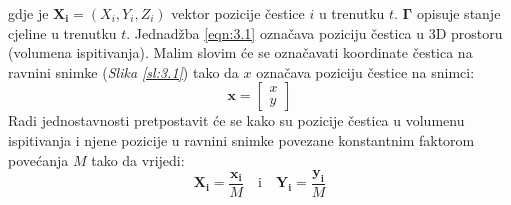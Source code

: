 gdje je $\boldsymbol{X_{i}}=\left(X_{i}, Y_{i}, Z_{i}\right)$ vektor pozicije čestice $i$ u trenutku $t$. $\boldsymbol{\Gamma}$ opisuje stanje cjeline u trenutku $t$. Jednadžba \ref{eqn:3.1} označava poziciju čestica u 3D prostoru (volumena ispitivanja). Malim slovim će se označavati koordinate čestica na ravnini snimke (\textit{Slika \ref{sl:3.1}}) tako da $x$ označava poziciju čestice na snimci:
\begin{equation}
	\boldsymbol{x} = \left[ \begin{array}{c}
		x\\
		y
	\end{array}\right]
\label{eqn:3.2}
\end{equation}
Radi jednostavnosti pretpostavit će se kako su pozicije čestica u volumenu ispitivanja i njene pozicije u ravnini snimke povezane konstantnim faktorom povećanja $M$ tako da vrijedi:
\begin{equation}
	\boldsymbol{X_{i}}=\dfrac{\boldsymbol{x_{i}}}{M} \quad\text{i}\quad \boldsymbol{Y_{i}}=\dfrac{\boldsymbol{y_{i}}}{M}
\label{eqn:3.3}
\end{equation}
\FloatBarrier
